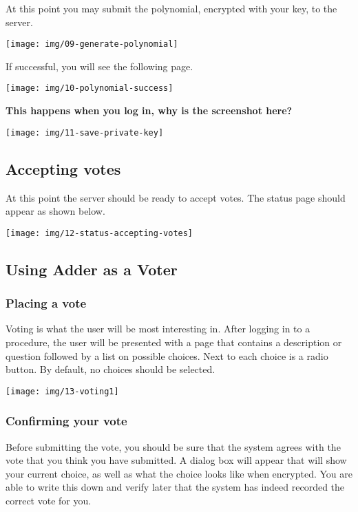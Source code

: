 \documentclass[letterpaper,10pt]{article}
\begin{document}
At this point you may submit the polynomial, encrypted with your
key, to the server.

\texttt{[image: img/09-generate-polynomial]}

If successful, you will see the following page.

\texttt{[image: img/10-polynomial-success]}

\textbf{This happens when you log in, why is the screenshot here?}

\texttt{[image: img/11-save-private-key]}

\subsection{Accepting votes}

At this point the server should be ready to accept votes. The status
page should appear as shown below.

\texttt{[image: img/12-status-accepting-votes]}

\subsection{Using Adder as a Voter}

\subsubsection{Placing a vote}

Voting is what the user will be most interesting in. After logging
in to a procedure, the user will be presented with a page that
contains a description or question followed by a list on possible
choices. Next to each choice is a radio button. By default, no
choices should be selected.

\texttt{[image: img/13-voting1]}

\subsubsection{Confirming your vote}

Before submitting the vote, you should be sure that the system
agrees with the vote that you think you have submitted. A dialog box
will appear that will show your current choice, as well as what the
choice looks like when encrypted. You are able to write this down
and verify later that the system has indeed recorded the correct
vote for you.
\end{document}
